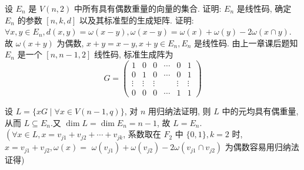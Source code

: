  \begin{tcolorbox}[breakable,colback=blue!5!white,colframe=blue!75!black,
 title= 解答题]

设 $ E_{n} $ 是 $ V(n, 2) $ 中所有具有偶数重量的向量的集合. 证明: $ E_{n} $ 是线性码, 确定 $ E_{n} $ 的参数 $ [n, k, d] $ 以及其标准型的生成矩阵.
\tcblower
证明: $ \forall x, y \in E_{n}, d(x, y)=\omega(x-y), \omega(x-y)=\omega(x)+\omega(y)-2 \omega(x \cap y) $. 故 $ \omega(x+y) $ 为偶数, $ x+y=x-y, x+y \in E_{n}, E_{n} $ 是线性码. 由上一章课后题知 $ E_{n} $ 是一个 $ [n, n-1,2] $ 线性码, 标准生成阵为
$$
G=\left(\begin{array}{cccccc}
1 & 0 & 0 & \cdots & 0 & 1 \\
0 & 1 & 0 & \cdots & 0 & 1 \\
\vdots & \vdots & \vdots & & \vdots & \vdots \\
0 & 0 & 0 & \cdots & 1 & 1
\end{array}\right)
$$

设 $ L=\{x G \mid \forall x \in V(n-1, q)\} $, 对 $ n $ 用归纳法证明, 则 $ L $ 中的元均具有偶重量, 从而 $ L \subseteq E_{n} $.又 $ \operatorname{dim} L=\operatorname{dim} E_{n}=n-1 $, 故 $ L=E_{n} $.
$ \left(\forall x \in L, x=v_{j 1}+v_{j 2}+\cdots+v_{j k}\right. $, 系数取在 $ F_{2} $ 中 $ \{0,1\}, k=2 $ 时, $ x=v_{j 1}+v_{j 2}, \omega(x)= $ $ \omega\left(v_{j 1}\right)+\omega\left(v_{j 2}\right)-2 \omega\left(v_{j 1} \cap v_{j 2}\right) $ 为偶数容易用归纳法证得)
 \end{tcolorbox}

